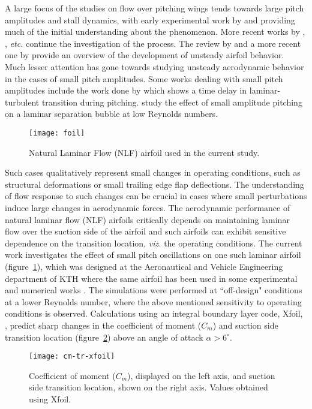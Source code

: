 \documentclass[twocolumn,10pt]{tsfp}
\begin{document}
A large focus of the studies on flow over pitching wings tends towards large pitch amplitudes and stall dynamics, with early experimental work by \cite{mccroskey82experimental} and \cite{carr1977} providing much of the initial understanding about the phenomenon. More recent works by \cite{dunne2015}, \cite{rival2010}, \cite{choudhry14} \emph{etc.} continue the investigation of the process. The review by \cite{mccroskey82} and a more recent one by \cite{coorke15} provide an overview of the development of unsteady airfoil behavior. Much lesser attention has gone towards studying unsteady aerodynamic behavior in the cases of small pitch amplitudes. Some works dealing with small pitch amplitudes include the work done by \cite{pascazio96} which shows a time delay in laminar-turbulent transition during pitching. \cite{nati15} study the effect of small amplitude pitching on a laminar separation bubble at low Reynolds numbers. 
\begin{figure}[b]
	\centering
	\texttt{[image: foil]}
	\caption{Natural Laminar Flow (NLF) airfoil used in the current study.}
	\label{fig:foil_david}
\end{figure}
Such cases qualitatively represent small changes in operating conditions, such as structural deformations or small trailing edge flap deflections. The understanding of flow response to such changes can be crucial in cases where small perturbations induce large changes in aerodynamic forces. The aerodynamic performance of natural laminar flow (NLF) airfoils critically depends on maintaining laminar flow over the suction side of the airfoil and such airfoils can exhibit sensitive dependence on the transition location, \emph{viz.} the operating conditions. The current work investigates the effect of small pitch oscillations on one such laminar airfoil (figure~\ref{fig:foil_david}), which was designed at the Aeronautical and Vehicle Engineering department of KTH where the same airfoil has been used in some experimental and numerical works \citep{lokatt17}. The simulations were performed at ``off-design" conditions at a lower Reynolds number, where the above mentioned sensitivity to operating conditions is observed. Calculations using an integral boundary layer code, Xfoil, \cite{drela89}, predict sharp changes in the coefficient of moment ($C_{m}$) and suction side transition location (figure~\ref{fig:xfoil_cm}) above an angle of attack $\alpha>6^{\circ}$.
\begin{figure}[t]
	\centering
	\texttt{[image: cm-tr-xfoil]}
	\caption{Coefficient of moment ($C_{m}$), displayed on the left axis, and suction side transition location, shown on the right axis. Values obtained using Xfoil.}
	\label{fig:xfoil_cm}
\end{figure}
\end{document}

